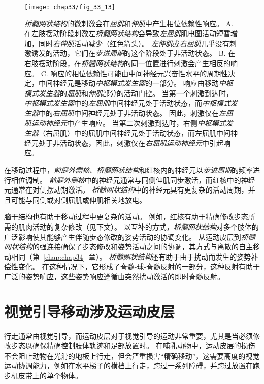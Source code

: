 \begin{figure}[htbp]
	\centering
	\texttt{[image: chap33/fig\_33\_13]}
	\caption{\textit{桥髓网状结构}的微刺激会在\textit{屈肌}和\textit{伸肌}中产生相位依赖性响应。
		A. 在左肢摆动阶段刺激左\textit{桥髓网状结构}会导致\textit{左屈肌}肌电图活动短暂增加，同时\textit{右伸肌}活动减少（红色箭头）。
		\textit{左伸肌}或\textit{右屈肌}几乎没有刺激诱发的活动，它们在\textit{步进周期}的这个阶段处于非活动状态。
		B. 在右肢摆动阶段，在\textit{桥髓网状结构}的同一位置进行刺激会产生相反的响应。
		C. 响应的相位依赖性可能由中间神经元兴奋性水平的周期性决定，中间神经元是移动\textit{中枢模式发生器}的一部分。
		响应由移动\textit{中枢模式发生器}的\textit{屈肌}和\textit{伸肌}部分的活动门控。
		当第一个刺激到达时，\textit{中枢模式发生器}中的\textit{左屈肌}中间神经元处于活动状态，而\textit{中枢模式发生器}中的\textit{右屈肌}中间神经元处于非活动状态。
		因此，刺激仅在\textit{左屈肌运动神经元}中产生响应。
		当第二次刺激到达时，右侧\textit{中枢模式发生器}（右屈肌）中的屈肌中间神经元处于活动状态，而左屈肌中间神经元处于非活动状态，因此，刺激仅在\textit{右屈肌运动神经元}中引起响应。}
	\label{fig:33_13}
\end{figure}


在移动过程中，\textit{前庭外侧核}、\textit{桥髓网状结构}和红核内的神经元以\textit{步进周期}的频率进行相位调制。
\textit{前庭外侧核}中的神经元通常与同侧伸肌同步激活，而红核中的神经元通常在对侧摆动期激活。
\textit{桥髓网状结构}中的神经元具有更复杂的活动周期，并且可能与同侧或对侧屈肌或伸肌相关地放电。


脑干结构也有助于移动过程中更复杂的活动。
例如，红核有助于精确修改步态所需的肌肉活动的复杂修改（见下文）。
以互补的方式，\textit{桥髓网状结构}对多个肢体的广泛影响使其能够产生伴随步态修改的姿势活动的协调变化。
从运动皮层到\textit{桥髓网状结构}的强连接确保了步态修改和姿势活动之间的协调，其方式与离散的自主移动相同（第~\ref{chap:chap34}~章）。
\textit{桥髓网状结构}还有助于由于扰动而发生的姿势补偿性变化。
在这种情况下，它形成了脊髓-球-脊髓反射的一部分，这种反射有助于广泛的姿势响应，这些姿势响应遵循由突然扰动激活的即时脊髓反射。



\section{视觉引导移动涉及运动皮层}

行走通常由视觉引导，而运动皮层对于视觉引导的运动非常重要，尤其是当必须修改步态以确保精确控制肢体轨迹和足部放置时。
在哺乳动物中，运动皮层的损伤不会阻止动物在光滑的地板上行走，但会严重损害“精确移动”，这需要高度的视觉运动协调能力，例如在水平梯子的横档上行走，跨过一系列障碍，并跨过放置在跑步机皮带上的单个物体。


